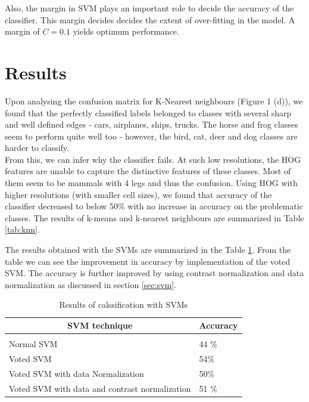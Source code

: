 \documentclass{article} %
\begin{document}
Also, the margin in SVM plays an important role to decide the accuracy of the classifier. This margin decides decides the extent of over-fitting in the model. A margin of $C=0.1$ yields optimum performance.

\section{Results} %
\label{sub:Results}
    Upon analysing the confusion matrix for K-Nearest neighbours (Figure 1 (d)), we found that the perfectly classified labels belonged to classes with several sharp and well defined edges - cars, airplanes, ships, trucks. The horse and frog classes seem to perform quite well too - however, the bird, cat, deer and dog classes are harder to classify.\\

        From this, we can infer why the classifier fails. At such low resolutions, the HOG features are unable to capture the distinctive features of these classes. Most of them seem to be mammals with 4 legs and thus the confusion. Using HOG with higher resolutions (with smaller cell sizes), we found that accuracy of the classifier decreased to below 50\% with no increase in accuracy on the problematic classes. The results of k-means and k-nearest neighbours are summarized in Table \ref{tab:knn}.
        
        The results obtained with the SVMs are summarized in the Table \ref{tab:svm}. From the table we can see the improvement in accuracy by implementation of the voted SVM. The accuracy is further improved by using contrast normalization and data normalization as discussed in section \ref{sec:svm}.
        
    
    
    


\begin{table}[t]
    \begin{center}
        \begin{tabular}{ll}
        \multicolumn{1}{c}{\bf SVM technique}  &\multicolumn{1}{c}{\bf Accuracy}
        \\ \hline \\
        Normal SVM         & 44 \% \\
        Voted SVM	& 54\% \\
        Voted SVM with data Normalization             & 50\% \\
        Voted SVM with data and contrast normalization &51 \% \\
        \end{tabular}
    \end{center}
    \caption{Results of calssification with SVMs}
    \label{tab:svm}
\end{table}
\end{document}
